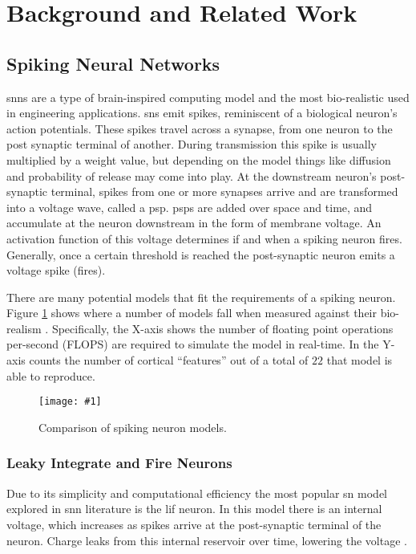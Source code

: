 \documentclass[conference]{IEEEtran}
\newcommand{\afigf}[3]{
	\begin{figure}[h]
    	\centering
		\texttt{[image: \#1]}
        \caption{#2.}
        \label{#3}
	\end{figure}
}
\begin{document}

\section{Background and Related Work}
\subsection{Spiking Neural Networks}
\Glspl{snn} are a type of brain-inspired computing model and the most
bio-realistic used in engineering applications. \Glspl{sn} emit spikes,
reminiscent of a biological neuron's action potentials. These spikes travel
across a synapse, from one neuron to the post synaptic terminal of
another. During transmission this spike is usually multiplied by a weight value,
but depending on the model things like diffusion and probability of release may
come into play. At the downstream neuron's post-synaptic terminal, spikes from
one or more synapses arrive and are transformed into a voltage wave, called a
\gls{psp}. \glspl{psp} are added over space and time, and accumulate at the
neuron downstream in the form of membrane voltage. An activation function of
this voltage determines if and when a spiking neuron fires. Generally,
once a certain threshold is reached the post-synaptic neuron emits a voltage
spike (fires).

There are many potential models that fit the requirements of a spiking
neuron. Figure \ref{fig:sn_model_compare} shows where a number of models fall
when measured against their bio-realism \parencite{hendy_2022}. Specifically,
the X-axis shows the number of floating point operations per-second (FLOPS) are
required to simulate the model in real-time. In the Y-axis counts the number of
cortical ``features'' out of a total of $22$ that model is able to reproduce.

\afigf{figures/JEI_31_1_010901_f004.png}{Comparison of spiking neuron
  models}{fig:sn_model_compare}

\subsubsection{Leaky Integrate and Fire Neurons}
Due to its simplicity and computational efficiency the most popular \gls{sn}
model explored in \gls{snn} literature is the \gls{lif} neuron. In this model
there is an internal voltage, which increases as spikes arrive at the
post-synaptic terminal of the neuron. Charge leaks from this internal reservoir
over time, lowering the voltage \parencite{ponulak_2011}.
\end{document}
